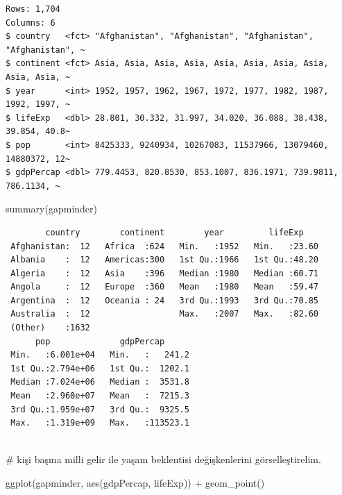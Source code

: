 \documentclass[
  letterpaper,
  DIV=11,
  numbers=noendperiod]{scrreprt}
\newenvironment{Shaded}{\begin{snugshade}}{\end{snugshade}}
\newcommand{\CommentTok}[1]{\textcolor[rgb]{0.37,0.37,0.37}{#1}}
\newcommand{\FunctionTok}[1]{\textcolor[rgb]{0.28,0.35,0.67}{#1}}
\newcommand{\NormalTok}[1]{\textcolor[rgb]{0.00,0.23,0.31}{#1}}
\newcommand{\SpecialCharTok}[1]{\textcolor[rgb]{0.37,0.37,0.37}{#1}}
\begin{document}
\begin{verbatim}
Rows: 1,704
Columns: 6
$ country   <fct> "Afghanistan", "Afghanistan", "Afghanistan", "Afghanistan", ~
$ continent <fct> Asia, Asia, Asia, Asia, Asia, Asia, Asia, Asia, Asia, Asia, ~
$ year      <int> 1952, 1957, 1962, 1967, 1972, 1977, 1982, 1987, 1992, 1997, ~
$ lifeExp   <dbl> 28.801, 30.332, 31.997, 34.020, 36.088, 38.438, 39.854, 40.8~
$ pop       <int> 8425333, 9240934, 10267083, 11537966, 13079460, 14880372, 12~
$ gdpPercap <dbl> 779.4453, 820.8530, 853.1007, 836.1971, 739.9811, 786.1134, ~
\end{verbatim}

\begin{Shaded}
\begin{Highlighting}[]
\FunctionTok{summary}\NormalTok{(gapminder)}
\end{Highlighting}
\end{Shaded}

\begin{verbatim}
        country        continent        year         lifeExp     
 Afghanistan:  12   Africa  :624   Min.   :1952   Min.   :23.60  
 Albania    :  12   Americas:300   1st Qu.:1966   1st Qu.:48.20  
 Algeria    :  12   Asia    :396   Median :1980   Median :60.71  
 Angola     :  12   Europe  :360   Mean   :1980   Mean   :59.47  
 Argentina  :  12   Oceania : 24   3rd Qu.:1993   3rd Qu.:70.85  
 Australia  :  12                  Max.   :2007   Max.   :82.60  
 (Other)    :1632                                                
      pop              gdpPercap       
 Min.   :6.001e+04   Min.   :   241.2  
 1st Qu.:2.794e+06   1st Qu.:  1202.1  
 Median :7.024e+06   Median :  3531.8  
 Mean   :2.960e+07   Mean   :  7215.3  
 3rd Qu.:1.959e+07   3rd Qu.:  9325.5  
 Max.   :1.319e+09   Max.   :113523.1  
                                       
\end{verbatim}

\begin{Shaded}
\begin{Highlighting}[]
\CommentTok{\# kişi başına milli gelir ile yaşam beklentisi değişkenlerini görselleştirelim.}

\FunctionTok{ggplot}\NormalTok{(gapminder, }\FunctionTok{aes}\NormalTok{(gdpPercap, lifeExp)) }\SpecialCharTok{+}
  \FunctionTok{geom\_point}\NormalTok{()}
\end{Highlighting}
\end{Shaded}
\end{document}
